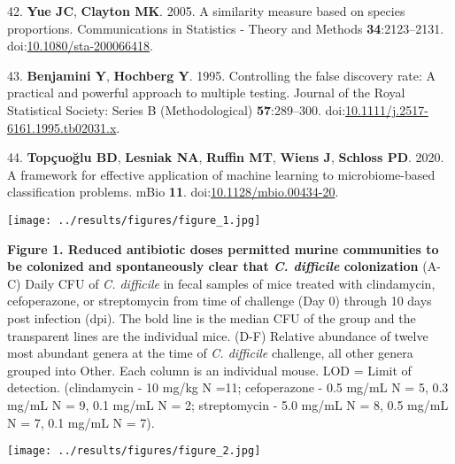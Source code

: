 \documentclass[11pt,]{article}
\newlength{\cslhangindent}
\newenvironment{cslreferences}%
  {\setlength{\parindent}{0pt}%
  \everypar{\setlength{\hangindent}{\cslhangindent}}\ignorespaces}%
  {\par}
\begin{document}
\begin{cslreferences}
\leavevmode\hypertarget{ref-yue2005}{}%
42. \textbf{Yue JC}, \textbf{Clayton MK}. 2005. A similarity measure
based on species proportions. Communications in Statistics - Theory and
Methods \textbf{34}:2123--2131.
doi:\href{https://doi.org/10.1080/sta-200066418}{10.1080/sta-200066418}.

\leavevmode\hypertarget{ref-benjamini1995}{}%
43. \textbf{Benjamini Y}, \textbf{Hochberg Y}. 1995. Controlling the
false discovery rate: A practical and powerful approach to multiple
testing. Journal of the Royal Statistical Society: Series B
(Methodological) \textbf{57}:289--300.
doi:\href{https://doi.org/10.1111/j.2517-6161.1995.tb02031.x}{10.1111/j.2517-6161.1995.tb02031.x}.

\leavevmode\hypertarget{ref-topcuoglu2020}{}%
44. \textbf{Topçuoğlu BD}, \textbf{Lesniak NA}, \textbf{Ruffin MT},
\textbf{Wiens J}, \textbf{Schloss PD}. 2020. A framework for effective
application of machine learning to microbiome-based classification
problems. mBio \textbf{11}.
doi:\href{https://doi.org/10.1128/mbio.00434-20}{10.1128/mbio.00434-20}.
\end{cslreferences}

\newpage

\texttt{[image: ../results/figures/figure\_1.jpg]}

\textbf{Figure 1. Reduced antibiotic doses permitted murine communities
to be colonized and spontaneously clear that \emph{C. difficile}
colonization} (A-C) Daily CFU of \emph{C. difficile} in fecal samples of
mice treated with clindamycin, cefoperazone, or streptomycin from time
of challenge (Day 0) through 10 days post infection (dpi). The bold line
is the median CFU of the group and the transparent lines are the
individual mice. (D-F) Relative abundance of twelve most abundant genera
at the time of \emph{C. difficile} challenge, all other genera grouped
into Other. Each column is an individual mouse. LOD = Limit of
detection. (clindamycin - 10 mg/kg N =11; cefoperazone - 0.5 mg/mL N =
5, 0.3 mg/mL N = 9, 0.1 mg/mL N = 2; streptomycin - 5.0 mg/mL N = 8, 0.5
mg/mL N = 7, 0.1 mg/mL N = 7).

\hfill\break

\texttt{[image: ../results/figures/figure\_2.jpg]}
\end{document}
